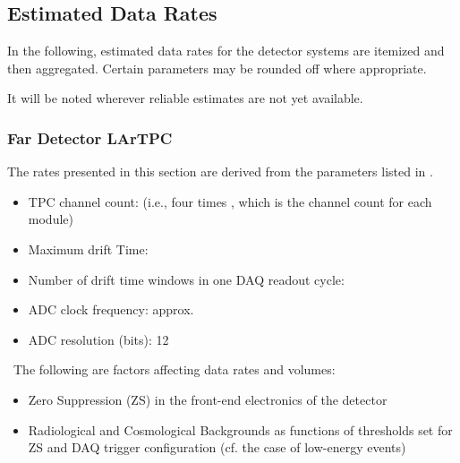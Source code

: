 \subsection{Estimated Data Rates} %

In the following, estimated data rates for %
the detector systems are itemized and then aggregated. Certain parameters may be rounded off where appropriate. %

It will be noted wherever reliable estimates are not yet available.  

\subsubsection{Far Detector LArTPC}
The rates presented in this section are derived from
the parameters listed in \anxrates. %
\begin{itemize}
\item TPC channel count: \dunenumberchannels (i.e., four times
  \daqchannelsperdetector, which is the channel count for each \tpcdetectormass module)
\item Maximum drift Time: \tpcdrifttime
\item Number of drift time windows in one DAQ readout cycle: \daqdriftsperreadout
\item ADC clock frequency: approx. \daqsamplerate
\item ADC resolution (bits): 12
\end{itemize}
\
The following are factors affecting data rates and volumes:
\begin{itemize}
\item Zero Suppression (ZS)  in the front-end electronics of the detector
\item Radiological and Cosmological Backgrounds as functions of thresholds set for ZS
and DAQ trigger configuration (cf. the case of low-energy events)
\end{itemize}

